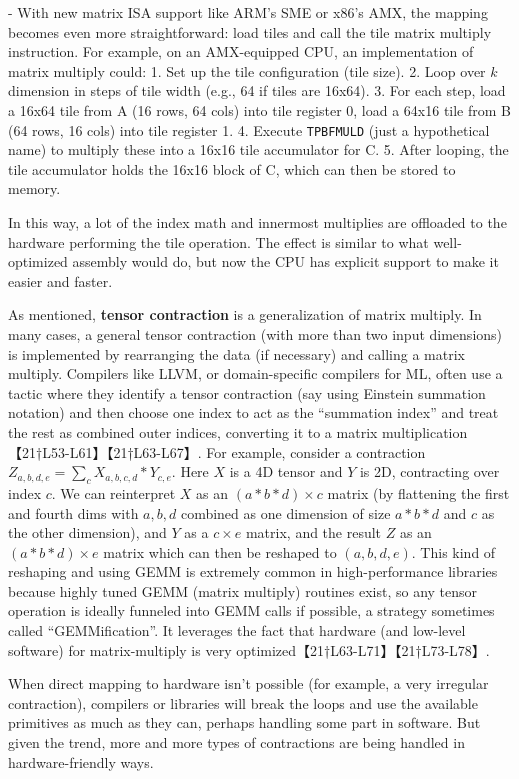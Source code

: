 - With new matrix ISA support like ARM’s SME or x86’s AMX, the mapping becomes even more straightforward: load tiles and call the tile matrix multiply instruction. For example, on an AMX-equipped CPU, an implementation of matrix multiply could:
  1. Set up the tile configuration (tile size).
  2. Loop over $k$ dimension in steps of tile width (e.g., 64 if tiles are 16x64).
  3. For each step, load a 16x64 tile from A (16 rows, 64 cols) into tile register 0, load a 64x16 tile from B (64 rows, 16 cols) into tile register 1.
  4. Execute \texttt{TPBFMULD} (just a hypothetical name) to multiply these into a 16x16 tile accumulator for C.
  5. After looping, the tile accumulator holds the 16x16 block of C, which can then be stored to memory.
  
  In this way, a lot of the index math and innermost multiplies are offloaded to the hardware performing the tile operation. The effect is similar to what well-optimized assembly would do, but now the CPU has explicit support to make it easier and faster.

As mentioned, \textbf{tensor contraction} is a generalization of matrix multiply. In many cases, a general tensor contraction (with more than two input dimensions) is implemented by rearranging the data (if necessary) and calling a matrix multiply. Compilers like LLVM, or domain-specific compilers for ML, often use a tactic where they identify a tensor contraction (say using Einstein summation notation) and then choose one index to act as the “summation index” and treat the rest as combined outer indices, converting it to a matrix multiplication【21†L53-L61】【21†L63-L67】. For example, consider a contraction $Z_{a,b,d,e} = \sum_{c} X_{a,b,c,d} * Y_{c,e}$. Here $X$ is a 4D tensor and $Y$ is 2D, contracting over index $c$. We can reinterpret $X$ as an $(a*b*d) \times c$ matrix (by flattening the first and fourth dims with $a, b, d$ combined as one dimension of size $a*b*d$ and $c$ as the other dimension), and $Y$ as a $c \times e$ matrix, and the result $Z$ as an $(a*b*d) \times e$ matrix which can then be reshaped to $(a,b,d,e)$. This kind of reshaping and using GEMM is extremely common in high-performance libraries because highly tuned GEMM (matrix multiply) routines exist, so any tensor operation is ideally funneled into GEMM calls if possible, a strategy sometimes called “GEMMification”. It leverages the fact that hardware (and low-level software) for matrix-multiply is very optimized【21†L63-L71】【21†L73-L78】.

When direct mapping to hardware isn’t possible (for example, a very irregular contraction), compilers or libraries will break the loops and use the available primitives as much as they can, perhaps handling some part in software. But given the trend, more and more types of contractions are being handled in hardware-friendly ways.

